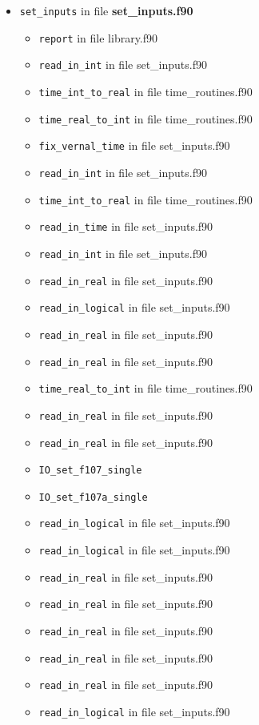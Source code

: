 \begin{itemize}
\item {\tt set\_inputs}   in file {\bf set\_inputs.f90}
  \begin{itemize}
    \item {\tt report} in file library.f90
    \item {\tt read\_in\_int} in file set\_inputs.f90
    \item {\tt time\_int\_to\_real} in file time\_routines.f90
    \item {\tt time\_real\_to\_int} in file time\_routines.f90
    \item {\tt fix\_vernal\_time} in file set\_inputs.f90
    \item {\tt read\_in\_int} in file set\_inputs.f90
    \item {\tt time\_int\_to\_real} in file time\_routines.f90
    \item {\tt read\_in\_time} in file set\_inputs.f90
    \item {\tt read\_in\_int} in file set\_inputs.f90
    \item {\tt read\_in\_real} in file set\_inputs.f90
    \item {\tt read\_in\_logical} in file set\_inputs.f90
    \item {\tt read\_in\_real} in file set\_inputs.f90
    \item {\tt read\_in\_real} in file set\_inputs.f90
    \item {\tt time\_real\_to\_int} in file time\_routines.f90
    \item {\tt read\_in\_real} in file set\_inputs.f90
    \item {\tt read\_in\_real} in file set\_inputs.f90
    \item {\tt IO\_set\_f107\_single}
    \item {\tt IO\_set\_f107a\_single}
    \item {\tt read\_in\_logical} in file set\_inputs.f90
    \item {\tt read\_in\_logical} in file set\_inputs.f90
    \item {\tt read\_in\_real} in file set\_inputs.f90
    \item {\tt read\_in\_real} in file set\_inputs.f90
    \item {\tt read\_in\_real} in file set\_inputs.f90
    \item {\tt read\_in\_real} in file set\_inputs.f90
    \item {\tt read\_in\_real} in file set\_inputs.f90
    \item {\tt read\_in\_logical} in file set\_inputs.f90

\end{itemize}
\end{itemize}

